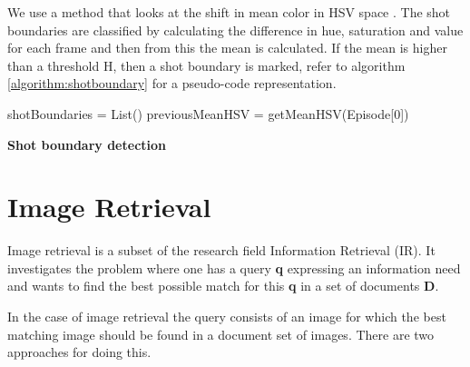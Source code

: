 \documentclass{report}
\begin{document}
We use a method that looks at the shift in mean color in HSV space \cite{shao2015shot}. The shot boundaries are classified by calculating the difference in hue, saturation and value for each frame and then from this the mean is calculated. If the mean is higher than a threshold H, then a shot boundary is marked, refer to algorithm \ref{algorithm:shotboundary} for a pseudo-code representation.

\begin{algorithm}[h] 
	\SetAlgoLined
	shotBoundaries = List()\;
	previousMeanHSV = getMeanHSV(Episode[0])\;
	\caption{\textbf{Shot boundary detection}}
	\label{algorithm:shotboundary}
\end{algorithm}

\chapter{Image Retrieval} \label{section:imageretrieval}
Image retrieval is a subset of the research field Information Retrieval (IR). It investigates the problem where one has a query \textbf{q} expressing an information need and wants to find the best possible match for this \textbf{q} in a set of documents \textbf{D}.

In the case of image retrieval the query consists of an image for which the best matching image should be found in a document set of images. There are two approaches for doing this.
\end{document}

